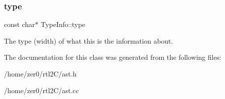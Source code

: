 \subsubsection{\texorpdfstring{type}{type}}
{\footnotesize\ttfamily const char$\ast$ Type\+Info\+::type\hspace{0.3cm}{\ttfamily [protected]}}

The type (width) of what this is the information about. 

The documentation for this class was generated from the following files\+:\begin{DoxyCompactItemize}
\item 
/home/zer0/rtl2\+C/ast.\+h\item 
/home/zer0/rtl2\+C/ast.\+cc\end{DoxyCompactItemize}
